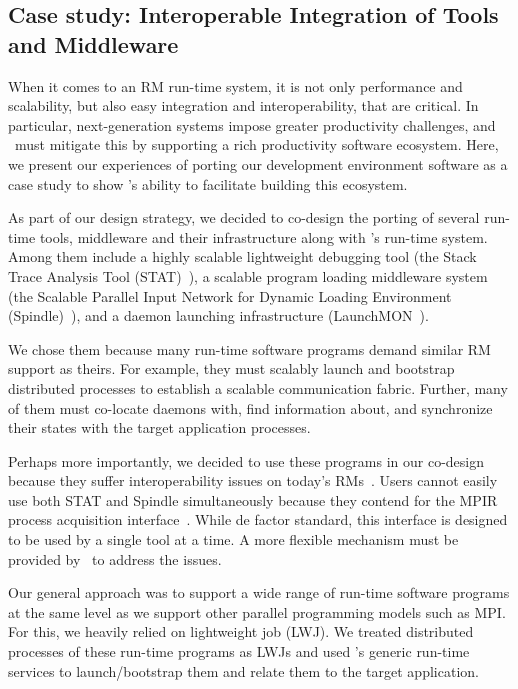 \subsection{Case study: Interoperable Integration of Tools and Middleware}
\label{case}
When it comes to an RM run-time system, it is 
not only performance and scalability,
but also easy integration and interoperability, that are critical.
In particular, next-generation systems impose greater productivity
challenges, and \flux\ must mitigate this by supporting a rich 
productivity software ecosystem. 
Here, we present our experiences of porting our development
environment software as a case study
to show \flux's ability to facilitate building this ecosystem. 

As part of our design strategy, we decided to 
co-design the porting of several run-time tools, middleware 
and their infrastructure along with \flux's run-time system. 
Among them include a highly scalable lightweight debugging tool
(the Stack Trace Analysis Tool (STAT)~\cite{STAT}),
a scalable program loading middleware system (the 
Scalable Parallel Input Network for Dynamic 
Loading Environment ({\sc Spindle})~\cite{SPINDLE}),
and a daemon launching infrastructure (LaunchMON~\cite{launchmon}). 

We chose them because many run-time software
programs demand similar RM support as theirs.
For example, they must scalably launch and bootstrap 
distributed processes to establish a scalable 
communication fabric. 
Further, many of them must co-locate daemons with, 
find information about, and synchronize their states with 
the target application processes.

Perhaps more importantly, we decided to use these programs
in our co-design because they suffer interoperability issues on 
today's RMs~\cite{Jette02slurm,ALPS,BGQRes,Castain05theopen}.
Users cannot easily use both STAT
and {\sc Spindle} simultaneously because they contend for
the MPIR process acquisition interface~\cite{MPIRInterface}.
While de factor standard, this interface is designed 
to be used by a single tool at a time. 
A more flexible mechanism must be provided by \flux\
to address the issues.

Our general approach was to support a wide range of run-time software programs 
at the same level as we support other parallel programming 
models such as MPI. For this, we heavily relied on lightweight 
job (LWJ). We treated 
distributed processes of these run-time programs
as LWJs and used \flux's 
generic run-time services to launch/bootstrap them and 
relate them to the target application.%

